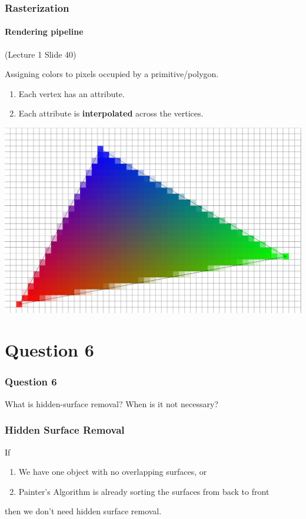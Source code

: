 \documentclass{beamer}
\begin{document}
\begin{frame}
    \frametitle{Rasterization}
    \framesubtitle{Rendering pipeline}

    (Lecture 1 Slide 40)

    Assigning colors to pixels occupied by a primitive/polygon.

    \begin{enumerate}
        \item Each vertex has an attribute.
        \item Each attribute is \textbf{interpolated} across the vertices.
    \end{enumerate}

    \vspace{1em}

    {\centering \includegraphics[scale=0.2]{rastertri.png}}

\end{frame}

\section{Question 6}

\begin{frame}
    \frametitle{Question 6}
    What is hidden-surface removal? When is it not necessary?
\end{frame}

\begin{frame}
    \frametitle{Hidden Surface Removal}

    If
    \begin{enumerate}
        \item We have one object with no overlapping surfaces, or
        \item Painter's Algorithm is already sorting the surfaces from back to front
    \end{enumerate}
    then we don't need hidden surface removal.

\end{frame}
\end{document}
